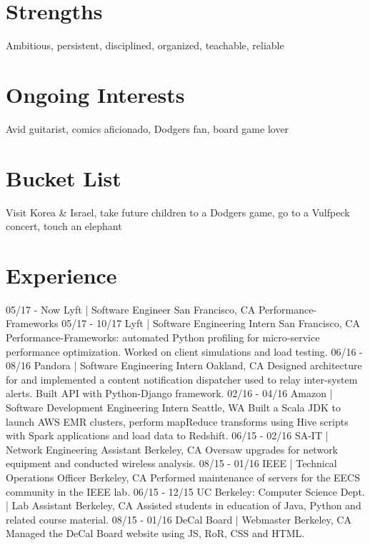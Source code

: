 \documentclass[]{friggeri-cv}
\begin{document}
\begin{aside}
  \section{Strengths}
    Ambitious, persistent, disciplined, organized, teachable, reliable
    ~
  \section{Ongoing Interests}
    Avid guitarist, comics aficionado, Dodgers fan, board game lover
    ~
  \section{Bucket List}
    Visit Korea \& Israel, take future children to a Dodgers game, go to a Vulfpeck concert, touch an elephant
    ~
\end{aside}

\section{Experience}
\begin{entrylist}
    \entry
    {05/17 - Now}
    {Lyft | Software Engineer}
    {San Francisco, CA}
    {Performance-Frameworks}
    \entry
    {05/17 - 10/17}
    {Lyft | Software Engineering Intern}
    {San Francisco, CA}
    {Performance-Frameworks: automated Python profiling for micro-service performance optimization. Worked on client simulations and load testing.}
    \entry
    {06/16 - 08/16}
    {Pandora | Software Engineering Intern}
    {Oakland, CA}
    {Designed architecture for and implemented a content notification dispatcher used to relay inter-system alerts. Built API with Python-Django framework.}
    \entry
    {02/16 - 04/16}
    {Amazon | Software Development Engineering Intern}
    {Seattle, WA}
    {Built a Scala JDK to launch AWS EMR clusters, perform mapReduce transforms using Hive scripts with Spark applications and load data to Redshift.}
    \entry
    {06/15 - 02/16}
    {SA-IT | Network Engineering Assistant}
    {Berkeley, CA}
    {Oversaw upgrades for network equipment and conducted wireless analysis.}
    \entry
    {08/15 - 01/16}
    {IEEE | Technical Operations Officer}
    {Berkeley, CA}
    {Performed maintenance of servers for the EECS community in the IEEE lab.}
    \entry
    {06/15 - 12/15}
    {UC Berkeley: Computer Science Dept. | Lab Assistant}
    {Berkeley, CA}
    {Assisted students in education of Java, Python and related course material.}
    \entry
    {08/15 - 01/16}
    {DeCal Board | Webmaster}
    {Berkeley, CA}
    {Managed the DeCal Board website using JS, RoR, CSS and HTML.}
\end{entrylist}
\end{document}
